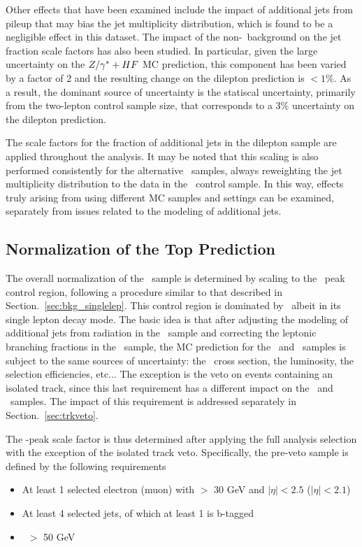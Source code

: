 Other effects that have been examined include the impact of 
additional jets from pileup that may bias the jet multiplicity
distribution, which  is found to be a negligible effect in this dataset. The
impact of the non-\ttll\ background on the jet fraction scale factors
has also been studied. In particular, given the large uncertainty on
the $Z/\gamma^*+HF$ MC prediction, this component has been varied by a factor
of 2 and the resulting change on the dilepton prediction is $<1\%$. As
a result, the dominant source of uncertainty is the statiscal
uncertainty, primarily from the two-lepton control sample size, that
corresponds to a $3\%$ uncertainty on the dilepton prediction. 

The scale factors for the fraction of additional jets in the dilepton
sample are applied throughout the analysis. It may be noted that this
scaling is also performed consistently for the alternative \ttbar\
samples, always reweighting the jet multiplicity distribution to the
data in the \ttll\ control sample. In this way, effects truly
arising from using different MC samples and settings can be examined,
separately from issues related to the modeling of additional jets. 

\subsection{Normalization of the Top Prediction}

The overall normalization of the \ttbar\ sample is determined by
scaling to the \mt\ peak control region, following a procedure similar 
to that described in Section.~\ref{sec:bkg_singlelep}. This control
region is dominated by \ttbar\, albeit in its single lepton decay
mode. The basic idea is that after adjusting the modeling of
additional jets from radiation in the \ttll\ sample and correcting  
the leptonic branching fractions in the \ttbar\ sample, the MC 
prediction for the \ttlj\ and \ttll\ samples is subject to the same
sources of uncertainty: the \ttbar\ cross section, the luminosity, the
selection efficiencies, etc$\dots$ The exception is the veto on events
containing an isolated track, since this last requirement has a different 
impact on the \ttlj\ and \ttll\ samples. The impact of this
requirement is addressed separately in Section.~\ref{sec:trkveto}. 

The \mt-peak scale factor is thus determined after applying the full
analysis selection with the exception of the isolated track veto. 
Specifically, the pre-veto sample is defined by the following requirements
\begin{itemize}
\item At least 1 selected electron (muon) with \pt $>$ 30 GeV and $|\eta|<2.5$ ($|\eta|<2.1$)
\item At least 4 selected jets, of which at least 1 is b-tagged
\item \met\ $>$ 50 GeV
\end{itemize}

